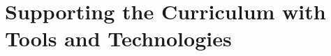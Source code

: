 
\chapter{Supporting the Curriculum with Tools and Technologies} %
\label{cha:supporting_the_curriculum}



